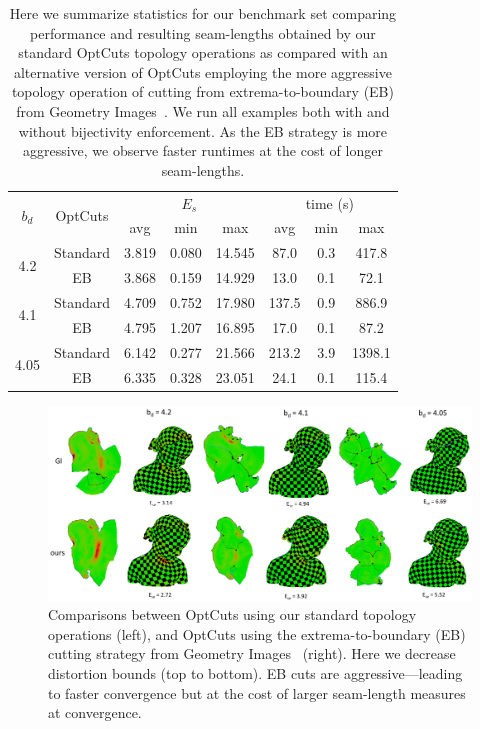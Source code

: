 \begin{table}[t]
\centering
\caption{
Here we summarize statistics for our benchmark set comparing performance and resulting seam-lengths obtained by our standard OptCuts topology operations as compared with an alternative version of OptCuts employing the more aggressive topology operation of cutting from extrema-to-boundary (EB) from Geometry Images~\cite{Gu2002Geometry}. We run all examples both with and without bijectivity enforcement. As the EB strategy is more aggressive, we observe faster runtimes at the cost of longer seam-lengths.} 
\label{tb:comp_GI}
\begin{tabular}{|c|c|ccc|ccc|}
\hline
\multirow{2}{*}{$b_d$} & \multirow{2}{*}{OptCuts} & \multicolumn{3}{c|}{$E_{s}$} & \multicolumn{3}{c|}{time (s)} \\ \cline{3-8} 
                       &                         & avg      & min     & max      & avg       & min    & max      \\ \hline
\multirow{2}{*}{4.2}   & Standard                    & 3.819   & 0.080  & 14.545  & 87.0   & 0.3 & 417.8 \\
                       & EB                & 3.868   & 0.159  & 14.929  & 13.0   & 0.1 & 72.1  \\ \hline
\multirow{2}{*}{4.1}   & Standard                    & 4.709   & 0.752  & 17.980  & 137.5  & 0.9 & 886.9 \\
                       & EB               & 4.795   & 1.207  & 16.895  & 17.0   & 0.1 & 87.2  \\ \hline
\multirow{2}{*}{4.05}  & Standard                    & 6.142   & 0.277  & 21.566  & 213.2  & 3.9 & 1398.1   \\
                       & EB                & 6.335   & 0.328  & 23.051  & 24.1   & 0.1 & 115.4 \\ \hline
\end{tabular}
\end{table}

\begin{figure}[t]
\centering
\includegraphics[width=0.8\linewidth]{fig/comp_GI.png}
\caption{Comparisons between OptCuts using our standard topology operations (left), and OptCuts using the extrema-to-boundary (EB) cutting strategy from Geometry Images~\cite{Gu2002Geometry} (right). Here we decrease distortion bounds (top to bottom). EB cuts are aggressive---leading to faster convergence but at the cost of larger seam-length measures at convergence.}
\label{fig:comp_GI}
\end{figure}

